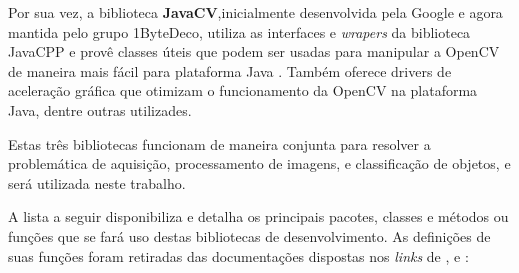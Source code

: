 Por sua vez, a biblioteca \textbf{JavaCV},inicialmente desenvolvida pela Google e agora mantida pelo grupo 1ByteDeco, utiliza as interfaces e \textit{wrapers} da biblioteca JavaCPP e provê classes úteis que podem ser usadas para manipular a  OpenCV de maneira mais fácil para plataforma Java \cite{javacv}. Também oferece drivers de aceleração gráfica que otimizam o funcionamento da OpenCV na plataforma Java, dentre outras utilizades.

Estas três bibliotecas funcionam de maneira conjunta para resolver a problemática de aquisição, processamento de imagens, e classificação de objetos, e será utilizada neste trabalho.

A lista a seguir disponibiliza e detalha os principais pacotes, classes e métodos ou funções que se fará uso destas bibliotecas de desenvolvimento. As definições de suas funções foram retiradas das documentações dispostas nos \textit{links} de \cite{opencv}, \cite{javacv} e \cite{javacpp}: 

